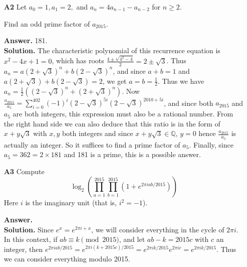 \documentclass[11pt,a4paper]{article}
\newcommand{\<}{\langle}
\renewcommand{\>}{\rangle}
\begin{document}
\begin{enumerate}
	\item[\textbf{A2}]Let $a_0=1,a_1=2,$ and $a_n=4a_{n-1}-a_{n-2}$ for $n\ge 2.$
	
	Find an odd prime factor of $a_{2015}.$
	
	\textbf{Answer.} 181. \\
	\textbf{Solution.} The characteristic polynomial of this recurrence equation is $x^2-4x+1=0$, which has roots $\frac{4\pm\sqrt{4^2-4}}{2}=2\pm\sqrt{3}$. Thus $a_n=a(2+\sqrt{3})^n+b(2-\sqrt{3})^n$, and since $a+b=1$ and $a(2+\sqrt{3})+b(2-\sqrt{3})=2$, we get $a=b=\frac 12$. Thus we have $a_n=\frac 12 ((2-\sqrt{3})^n + (2+\sqrt{3})^n)$. 
	Now $\frac{a_{2015}}{a_5}=\sum_{i=0}^{402}(-1)^{i}(2-\sqrt{3})^{5i}(2-\sqrt{3})^{2010+5i}$, and since both $a_{2015}$ and $a_5$ are both integers, this expression must also be a rational number. From the right hand side we can also deduce that this ratio is in the form of $x+y\sqrt{3}$ with $x, y$ both integers and since $x+y\sqrt{3}\in \mathbb{Q}$, $y=0$ hence $\frac{a_{2015}}{a_5}$ is actually an integer. So it suffices to find a prime factor of $a_5$. Finally, since $a_5=362=2\times 181$ and 181 is a prime, this is a possible answer. 
	
	\item[\textbf{A3}]Compute \[\log_2\left(\prod_{a=1}^{2015}\prod_{b=1}^{2015}\left(1+e^{2\pi iab/2015}\right)\right)\]Here $i$ is the imaginary unit (that is, $i^2=-1$).
	
	\textbf{Answer.} \\
	\textbf{Solution.} Since $e^x = e^{2\pi i + x}$, we will consider everything in the cycle of $2\pi i$. In this context, if $ab\equiv k\pmod{2015}$, and let $ab-k=2015c$ with $c$ an integer, then $e^{2\pi iab/2015}=e^{2\pi i(k+2015c)/2015}=e^{2\pi ik/2015}e^{2\pi ic}=e^{2\pi ik/2015}$. Thus we can consider everything modulo 2015. 
	

\end{enumerate}
\end{document}

